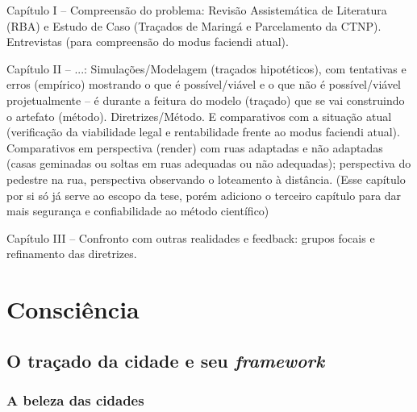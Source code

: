 \documentclass[]{report}
\begin{document}
	Capítulo I – Compreensão do problema: Revisão Assistemática de Literatura (RBA) e Estudo de Caso (Traçados de Maringá e Parcelamento da CTNP). Entrevistas (para compreensão do modus faciendi atual).

	Capítulo II – ...: Simulações/Modelagem (traçados hipotéticos), com tentativas e erros (empírico) mostrando o que é possível/viável e o que não é possível/viável projetualmente – é durante a feitura do modelo (traçado) que se vai construindo o artefato (método). Diretrizes/Método. E comparativos com a situação atual (verificação da viabilidade legal e rentabilidade frente ao modus faciendi atual). Comparativos em perspectiva (render) com ruas adaptadas e não adaptadas (casas geminadas ou soltas em ruas adequadas ou não adequadas); perspectiva do pedestre na rua, perspectiva observando o loteamento à distância. (Esse capítulo por si só já serve ao escopo da tese, porém adiciono o terceiro capítulo para dar mais segurança e confiabilidade ao método científico)

	Capítulo III – Confronto com outras realidades e feedback: grupos focais e refinamento das diretrizes.

	\part[Consciência]{Consciência}
	\setcounter{secnumdepth}{1}
	\chapter{O traçado da cidade e seu \textit{framework}}
		\section{A beleza das cidades}
\end{document}
